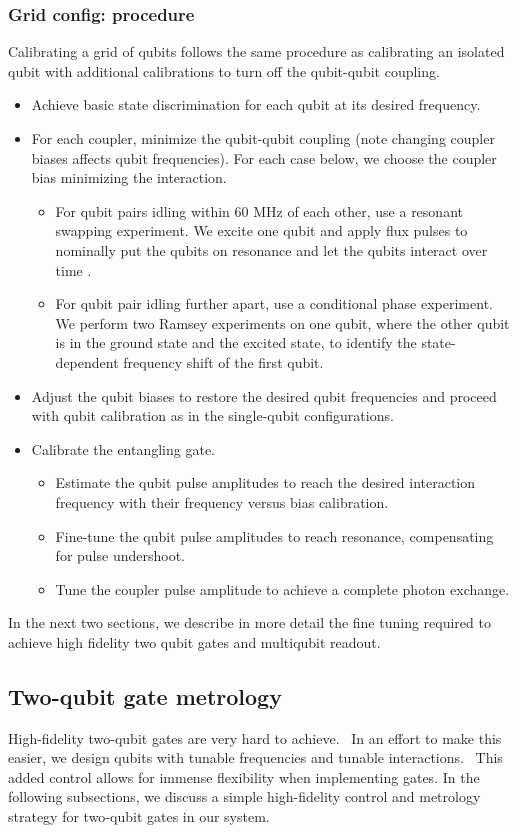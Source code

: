 \subsubsection{Grid config: procedure}
Calibrating a grid of qubits follows the same procedure as calibrating an isolated qubit with additional calibrations to turn off the qubit-qubit coupling. 
\begin{itemize}
\item Achieve basic state discrimination for each qubit at its desired frequency.
\item For each coupler, minimize the qubit-qubit coupling (note changing coupler biases affects qubit frequencies). For each case below, we choose the coupler bias minimizing the interaction.
\begin{itemize}
    \item For qubit pairs idling within 60 MHz of each other, use a resonant swapping experiment. We excite one qubit and apply flux pulses to nominally put the qubits on resonance and let the qubits interact over time \cite{andrew_thesis}.
    \item For qubit pair idling further apart, use a conditional phase experiment. We perform two Ramsey experiments on one qubit, where the other qubit is in the ground state and the excited state, to identify the state-dependent frequency shift of the first qubit.
\end{itemize}
\item Adjust the qubit biases to restore the desired qubit frequencies and proceed with qubit calibration as in the single-qubit configurations.
\item Calibrate the entangling gate.
\begin{itemize}
    \item Estimate the qubit pulse amplitudes to reach the desired interaction frequency with their frequency versus bias calibration.
    \item Fine-tune the qubit pulse amplitudes to reach resonance, compensating for pulse undershoot.
    \item Tune the coupler pulse amplitude to achieve a complete photon exchange.
\end{itemize}
\end{itemize}

In the next two sections, we describe in more detail the fine tuning required to achieve high fidelity two qubit gates and multiqubit readout.

\subsection{Two-qubit gate metrology}
High-fidelity two-qubit gates are very hard to achieve.  In an effort to make this easier, we design qubits with tunable frequencies and tunable interactions.  This added control allows for immense flexibility when implementing gates.  In the following subsections, we discuss a simple high-fidelity control and metrology strategy for two-qubit gates in our system. 


